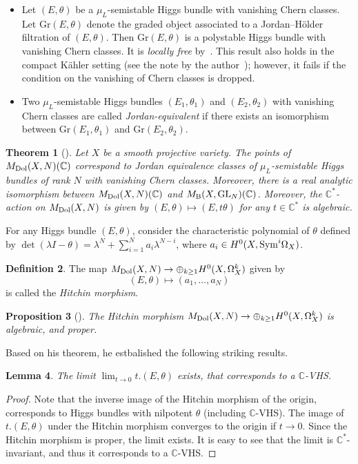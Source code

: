 \documentclass[english]{amsproc}
\theoremstyle{plain}
\newtheorem{thm}{Theorem}[section]
\newtheorem{lem}[thm]{Lemma}
\newtheorem{proposition}[thm]{Proposition}
\theoremstyle{definition}
\newtheorem{dfn}[thm]{Definition}
\theoremstyle{remark}
\theoremstyle{plain}
\numberwithin{equation}{thm} %
\newcommand{\bC}{\mathbb{C}}
\newcommand{\GL}{{\rm GL}}
\begin{document}
\begin{itemize}
	\item Let $(E,\theta)$ be a $\mu_L$-semistable Higgs bundle with vanishing Chern classes. Let $\mathrm{Gr}(E, \theta)$ denote the graded object associated to a Jordan--H\"older filtration of $(E,\theta)$. Then $\mathrm{Gr}(E,\theta)$ is a polystable Higgs bundle with vanishing Chern classes. It is \emph{locally free} by~\cite[Theorem~2]{Sim92}. This result also holds in the compact K\"ahler setting (see the note by the author~\cite{DenSim}); however, it fails if the condition on the vanishing of Chern classes is dropped.
	\item Two $\mu_L$-semistable Higgs bundles $(E_1,\theta_1)$ and $(E_2,\theta_2)$ with vanishing Chern classes are called \emph{Jordan-equivalent} if there exists an isomorphism between $\mathrm{Gr}(E_1,\theta_1)$ and $\mathrm{Gr}(E_2, \theta_2)$.
\end{itemize}
\begin{thm}[\cite{Sim94}]\label{thm:analytic iso}
	Let $X$ be a smooth projective variety.  The points of $M_{\rm Dol}(X,N)(\bC)$ correspond to Jordan
	equivalence classes of $\mu_L$-semistable  Higgs bundles of rank $N$ with vanishing Chern classes.   Moreover, there is a real analytic isomorphism between $M_{\rm Dol}(X,N)(\bC)$ and $M_{\rm B}(X,\GL_N)(\bC)$. Moreover, the $\bC^*$-action on $M_{\rm Dol}(X,N)$ is given by $(E,\theta)\mapsto (E,t\theta)$ for any $t\in\bC^*$ is algebraic. 
\end{thm} 
For any Higgs bundle $(E,\theta)$, consider the characteristic polynomial  of $\theta$ defined by   $\det (\lambda I-\theta)=\lambda^N+\sum_{i=1}^{N} a_i\lambda^{N-i}$, where $a_i\in H^0(X,{\rm Sym}^i\Omega_X)$. 
\begin{dfn}
	The map $M_{\rm Dol}(X,N)\to \oplus_{k\geq 1} H^0(X,\Omega_X^k)$  given by 
	$$
	(E,\theta)\mapsto (a_1,\ldots,a_N) 
	$$
	is called the \emph{Hitchin morphism}. 
\end{dfn} 
\begin{proposition}[\cite{Sim94b}]\label{prop:proper}
	The Hitchin morphism   $M_{\rm Dol}(X,N)\to \oplus_{k\geq 1} H^0(X,\Omega_X^k)$  is algebraic, and \emph{proper}. 
\end{proposition}
Based on his theorem, he estbalished the following striking results.
\begin{lem}\label{lem:limit}
	The limit $\lim_{t\to 0}t.(E,\theta)$ exists, that corresponds to a $\bC$-VHS. 
\end{lem} 
\begin{proof}
	Note that the inverse image of the Hitchin morphism of the origin, corresponds to Higgs bundles with nilpotent $\theta$ (including $\bC$-VHS). The image of $t.(E,\theta)$ under the Hitchin morphism converges to the origin if $t\to 0$. Since the Hitchin morphism is proper, the limit exists.  It is easy to see that the limit is $\bC^*$-invariant, and thus it corresponds to a $\bC$-VHS. 
\end{proof}
\end{document}
